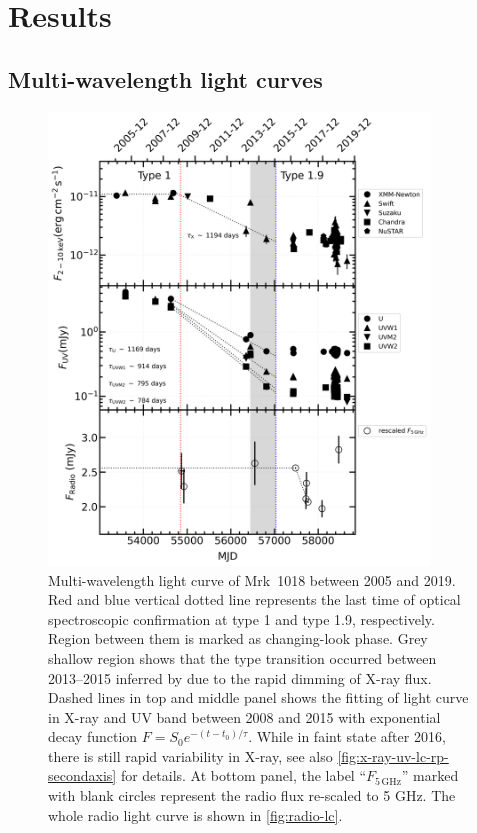 \documentclass[twocolumn]{aastex63}
\begin{document}
\section{Results}
\label{sec:result}

\subsection{Multi-wavelength light curves}
\label{sec:multi-lc}

\begin{figure}
\centering
	\includegraphics[width=0.9\textwidth]{./pic/subplots-xrt_uvot-radio-second.png}
    \caption{Multi-wavelength light curve of Mrk~1018 between 2005 and 2019. Red and blue vertical dotted line represents the last time of optical spectroscopic confirmation at type 1 and type 1.9, respectively. Region between them is marked as changing-look phase. Grey shallow region shows that the type transition occurred between 2013--2015 inferred by \citet{2017A&A...607L...9K} due to the rapid dimming of X-ray flux. Dashed lines in top and middle panel shows the fitting of light curve in X-ray and UV band between 2008 and 2015 with exponential decay function $F=S_0 e^{-(t-t_0)/\tau }$.  While in faint state after 2016, there is still rapid variability in X-ray, see also \autoref{fig:x-ray-uv-lc-rp-secondaxis} for details. At bottom panel, the label ``$F_\mathrm{5\,GHz}$'' marked with blank circles represent the radio flux re-scaled to 5 GHz. The whole radio light curve is shown in \autoref{fig:radio-lc}.}
    \label{fig:multi-lc-secondaxis}
\end{figure}
\end{document}
